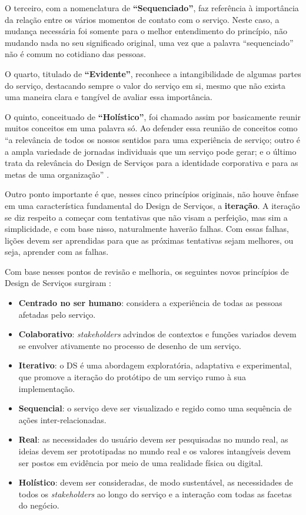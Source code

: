 O terceiro, com a nomenclatura de \textbf{``Sequenciado''}, faz referência à importância da relação entre os vários momentos de contato com o serviço. Neste caso, a mudança necessária foi somente para o melhor entendimento do princípio, não mudando nada no seu significado original, uma vez que a palavra ``sequenciado'' não é comum no cotidiano das pessoas.

O quarto, titulado de \textbf{``Evidente''}, reconhece a intangibilidade de algumas partes do serviço, destacando sempre o valor do serviço em si, mesmo que não exista uma maneira clara e tangível de avaliar essa importância.

O quinto, conceituado de \textbf{``Holístico''}, foi chamado assim por basicamente reunir muitos conceitos em uma palavra só. Ao defender essa reunião de conceitos como ``a relevância de todos os nossos sentidos para uma experiência de serviço; outro é a ampla variedade de jornadas individuais que um serviço pode gerar; e o último trata da relevância do Design de Serviços para a identidade corporativa e para as metas de uma organização'' \cite{Stickdorn2019}.

Outro ponto importante é que, nesses cinco princípios originais, não houve ênfase em uma característica fundamental do Design de Serviços, a \textbf{iteração}. A iteração se diz respeito a começar com tentativas que não visam a perfeição, mas sim a simplicidade, e com base nisso, naturalmente haverão falhas. Com essas falhas, lições devem ser aprendidas para que as próximas tentativas sejam melhores, ou seja, aprender com as falhas.

Com base nesses pontos de revisão e melhoria, os seguintes novos princípios de Design de Serviços surgiram \cite{Stickdorn2019}:

\begin{itemize}
	\item \textbf{Centrado no ser humano}: considera a experiência de todas as pessoas afetadas pelo serviço.
	\item \textbf{Colaborativo}: \textit{stakeholders} advindos de contextos e funções variados devem se envolver ativamente no processo de desenho de um serviço.
	\item \textbf{Iterativo}: o DS é uma abordagem exploratória, adaptativa e experimental, que promove a iteração do protótipo de um serviço rumo à sua implementação.
	\item \textbf{Sequencial}: o serviço deve ser visualizado e regido como uma sequência de ações inter-relacionadas.
	\item \textbf{Real}: as necessidades do usuário devem ser pesquisadas no mundo real, as ideias devem ser prototipadas no mundo real e os valores intangíveis devem ser postos em evidência por meio de uma realidade física ou digital.
	\item \textbf{Holístico}: devem ser consideradas, de modo sustentável, as necessidades de todos os \textit{stakeholders} ao longo do serviço e a interação com todas as facetas do negócio.
\end{itemize}

